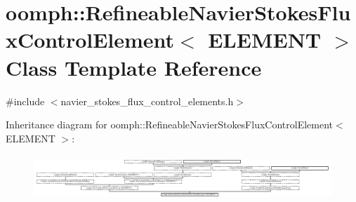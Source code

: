 \hypertarget{classoomph_1_1RefineableNavierStokesFluxControlElement}{}\section{oomph\+:\+:Refineable\+Navier\+Stokes\+Flux\+Control\+Element$<$ E\+L\+E\+M\+E\+NT $>$ Class Template Reference}
\label{classoomph_1_1RefineableNavierStokesFluxControlElement}


{\ttfamily \#include $<$navier\+\_\+stokes\+\_\+flux\+\_\+control\+\_\+elements.\+h$>$}

Inheritance diagram for oomph\+:\+:Refineable\+Navier\+Stokes\+Flux\+Control\+Element$<$ E\+L\+E\+M\+E\+NT $>$\+:\begin{figure}[H]
\begin{center}
\leavevmode
\includegraphics[height=1.727506cm]{classoomph_1_1RefineableNavierStokesFluxControlElement}
\end{center}
\end{figure}
